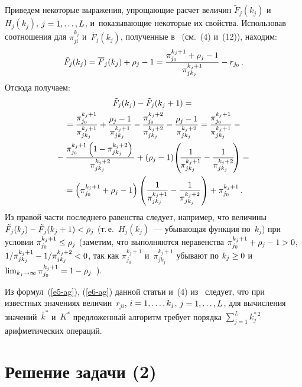 \begin{multicols}{2}
  Приведем некоторые выражения, упрощающие расчет величин 
$\tilde{F}_j(k_j)$ и~$H_j(k_j)$, $j\hm=1,\ldots, L$, и~показывающие некоторые 
их свойства. Использовав соотношения для $\pi^{k_j}_{ji}$ 
и~$\overline{F}_j(k_j)$, полученные в~\cite{12-ag} (см.~(4) и~(12)), находим:
  \begin{equation}
  \tilde{F}_j(k_j)=\overline{F}_j(k_j)+\rho_j -1 =\displaystyle\frac{\displaystyle \pi_{j_0}^{k_j+1}+\rho_j-1\mathstrut}{\displaystyle \pi_{jk_j}^{k_j+1}\mathstrut}-r_{j_0}\,.
  \label{e6-ag}
  \end{equation}
Отсюда получаем:
\begin{multline*}
\tilde{F}_j(k_j) -\tilde{F}_j(k_j+1)={}\\
{}= \displaystyle\frac{\displaystyle \pi_{j_0}^{k_j+1}\mathstrut}{\displaystyle \pi_{jk_j}^{k_j+1}\mathstrut}+ 
\displaystyle\frac{\displaystyle \rho_j-1\mathstrut}{\displaystyle \pi^{k_j+1}_{jk_j}\mathstrut}- \displaystyle\frac{\displaystyle \pi_{j_0}^{k_j+2}\mathstrut}{\displaystyle \pi_{jk_j}^{k_j+2}\mathstrut}-
\displaystyle\frac{\displaystyle \rho_j-1\mathstrut}{\displaystyle \pi_{jk_j}^{k_j+2}\mathstrut}=
\displaystyle\frac{\displaystyle \pi_{j_0}^{k_j+1}\mathstrut}{\displaystyle \pi_{jk_j}^{k_j+1}\mathstrut} -{}\\
{}- \displaystyle\frac{\displaystyle \pi_{j_0}^{k_j+1}\left(1-
\pi_{jk_j}^{k_j+2}\right)\mathstrut}{\displaystyle \pi_{jk_j}^{k_j+2}\mathstrut}+
\left( \rho_j-1\right) \!\left(\! \displaystyle\frac{\displaystyle 1\mathstrut}{\displaystyle \pi_{jk_j}^{k_j+1}\mathstrut}-
\displaystyle\frac{\displaystyle 1\mathstrut}{\displaystyle \pi_{jk_j}^{k_j+2}\mathstrut}\!\right)={}\\
{}= \left( \pi_{j_0}^{k_j+1}+\rho_j -1\right) \left( \displaystyle\frac{\displaystyle 1\mathstrut}{\displaystyle  \pi_{jk_j}^{k_j+1}\mathstrut}-
\displaystyle\frac{\displaystyle 1\mathstrut}{\displaystyle \pi_{jk_j}^{k_j+2}\mathstrut}\right) +\pi_{j_0}^{k_j+1}\,.
\end{multline*}
Из правой части последнего равенства следует, например, что величины 
$\tilde{F}_j(k_j)\hm-\tilde{F}_j(k_j\hm+1)\hm< \rho_j$ (т.\,е.~$H_j(k_j)$~--- 
убывающая функция по~$k_j$) при условии $\pi_{j_0}^{k_j+1}\hm\leq \rho_j$ 
(заметим, что выполняются неравенства $\pi_{j_0}^{k_j+1} \hm+\rho_j\hm- 
1\hm>0$, $1/\pi_{jk_j}^{k_j+1} \hm- 1/\pi_{jk_j}^{k_j+2} \hm<0$, так как 
$\pi_{j_0}^{k_j+1}$ и~$\pi_{jk_j}^{k_j+1}$ убывают по $k_j\hm\geq 0$ 
и~$\lim\nolimits_{k_j\to\infty} \pi_{j_0}^{k_j+1} \hm= 1\hm- \rho_j$~\cite{14-ag}). 

Из формул~(\ref{e5-ag}), (\ref{e6-ag}) данной статьи и~(4) из~\cite{12-ag} 
следует, что при известных значениях величин~$r_{ji}$, $i\hm=1,\ldots, k_j$, 
$j\hm=1,\ldots , L$, для вычисления значений~$\overline{k}^*$ и~$K^*$ 
предложенный алгоритм требует порядка $\sum\nolimits^L_{j=1} k_j^{*\,2}$ 
арифметических операций.

 \section{Решение задачи (2)}


\end{multicols}
